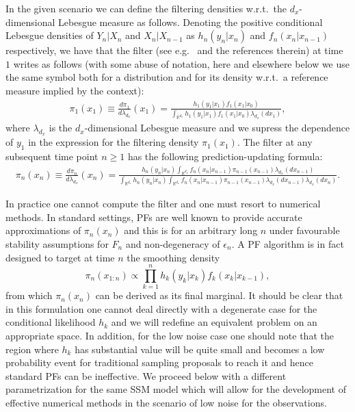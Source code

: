 \documentclass[english,13pt]{article}
\numberwithin{equation}{section}
\begin{document}
In the given scenario we can define the filtering densities w.r.t.~the $d_x$-dimensional Lebesgue measure as follows.
Denoting the positive conditional Lebesgue densities of $Y_n|X_n$ and $X_n|X_{n-1}$ as $h_n(y_n|x_n)$ and $f_n(x_n|x_{n-1})$ respectively, we have that the filter (see e.g.~\cite{bain} and the references therein) at time $1$ writes as follows (with some abuse of notation, here and elsewhere below we use the same symbol both for a distribution and for its density w.r.t.~a reference measure implied by the context): 
%
\begin{align}
\label{eq:f-1}
\pi_1(x_1)\equiv \frac{d\pi_1}{d\lambda_{d_x}}(x_1) =  \frac{h_1(y_1|x_1)f_1(x_1|x_0)}{\int_{\mathbb{R}^{d_x}}h_1(y_1|x_1)f_1(x_1|x_0)\lambda_{d_x}(dx_1)},
\end{align}
%
where $\lambda_{d_x}$ is the $d_x$-dimensional Lebesgue measure and we supress the dependence of $y_1$ in the expression for the filtering density $\pi_1(x_1)$.
The filter at any subsequent time point $n\geq 1$ has the following prediction-updating formula:
%
\begin{align}
\label{eq:f-n}
\pi_n(x_n) \equiv   \frac{d\pi_n}{d\lambda_{d_x}}(x_n) =  \frac{h_n(y_n|x_n)\int_{\mathbb{R}^{d_x}} f_n(x_n|x_{n-1})\pi_{n-1}(x_{n-1})\lambda_{d_x}(dx_{n-1})}{\int_{\mathbb{R}^{d_x}}h_n(y_n|x_n)\int_{\mathbb{R}^{d_x}} f_n(x_n|x_{n-1})\pi_{n-1}(x_{n-1})\lambda_{d_x}(dx_{n-1})\lambda_{d_x}(dx_n)}.
\end{align}
%

In practice one cannot compute the filter  and one must resort to numerical methods. In standard settings, PFs are well known to provide accurate approximations of $\pi_n(x_n)$ and this is for an arbitrary long $n$ under favourable stability assumptions for $F_n$ and non-degeneracy of $\epsilon_n$. A PF algorithm is in fact designed to target at time $n$ the smoothing density
$$
\pi_n({x}_{1:n}) \propto \prod_{k=1}^n h_k(y_k|x_k)
f_k({x}_k|x_{k-1}),
$$
from which $\pi_n(x_n)$ can be derived as its final marginal. It should be clear that in this formulation one cannot deal directly with a degenerate case for the conditional likelihood $h_k$ and we will redefine an equivalent problem on an appropriate space. In addition, for the low noise case one should note that the region where $h_k$ has substantial value will be quite small and becomes a low probability event for traditional sampling proposals to reach it and hence standard PFs can be ineffective.
We proceed below with a different parametrization for the same SSM model which will allow for the development of effective numerical methods in the scenario of low noise for the observations.  %
\end{document}
